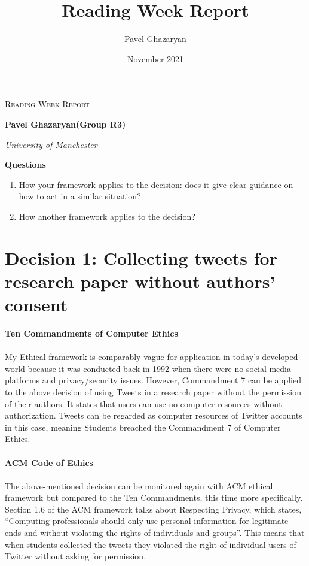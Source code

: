 \documentclass[a4paper]{report}
\title{Reading Week Report}
\author{Pavel Ghazaryan}
\date{November 2021}
\begin{document}
\begin{titlepage}
    \begin{center}

            \vspace*{1cm}
            \Huge
            \textsc{Reading Week Report}
            
            \vspace{0.5cm}
            \Large
            
            \vspace{1.5cm}
        
            \textbf{Pavel Ghazaryan(Group R3)}
            
            \vspace{1.5cm}
            \it{University of Manchester}
        
            \vfill
                    
                
             
    \end{center}
\end{titlepage}
\newpage
\newpage
\Large
\textbf{Questions}
\begin{enumerate}
    \item How your framework applies to the decision: does it give clear guidance on how to act in a similar situation? 
    \item How another framework applies to the decision?
\end{enumerate}
\newpage
\section{Decision 1: Collecting tweets for research paper without authors’ consent\cite{casestudy}}
\textbf{Ten Commandments of Computer Ethics\cite{tencommands}}\\\\
My Ethical framework is comparably vague for application in today’s developed world because it was conducted back in 1992 when there were no social media platforms and privacy/security issues. However, Commandment 7\cite{tencommands} can be applied to the above decision of using Tweets in a research paper without the permission of their authors. It states that users can use no computer resources without authorization. Tweets can be regarded as computer resources of Twitter accounts\cite{casestudy} in this case, meaning Students breached the Commandment 7 of Computer Ethics. \\\\
\textbf{ACM Code of Ethics\cite{ACM}}\\\\
The above-mentioned decision can be monitored again with ACM ethical framework but compared to the Ten Commandments, this time more specifically. Section 1.6 of the ACM framework talks about Respecting Privacy, which states, “Computing professionals should only use personal information for legitimate ends and without violating the rights of individuals and groups”\cite{ACM}. This means that when students collected the tweets they violated the right of individual users of Twitter without asking for permission.\\\\
\end{document}
